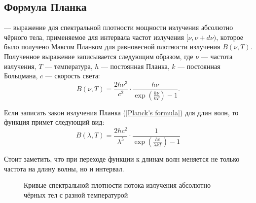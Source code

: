 \subsection{Формула Планка}

 --- выражение для спектральной плотности мощности излучения абсолютно чёрного тела, применяемое  для интервала частот излучения  $[\nu, \nu + d \nu)$, которое было получено Максом Планком для равновесной плотности излучения $B(\nu,T)$. Полученное выражение записывается следующим образом, где $\nu$ --- частота излучения, $T$ --- температура, $h$ --- постоянная Планка, $k$ --- постоянная Больцмана, $c$ --- скорость света:
\begin{equation}\label{Planck's formula}
B(\nu,T)=\frac{2h\nu^3}{c^2}\cdot \frac{h\nu}{\exp\left(\frac{h\nu}{kT}\right)-1}.
\end{equation}

Если записать закон излучения Планка (\ref{Planck's formula}) для длин волн, то функция примет следующий вид:
\begin{equation}\label{Planck's formula2}
B(\lambda,T)=\frac{2hc^2}{\lambda^5} \cdot \frac{1}{\exp\left(\frac{hc}{\lambda kT}\right)-1}
\end{equation}

Стоит заметить, что при переходе функции к длинам волн меняется не только частота на длину волны, но и интервал. 

\begin{figure}[h!]
\begin{center}
\end{center}
\caption{Кривые спектральной плотности потока излучения абсолютно чёрных тел с разной температурой}\label{pic:wien-law}
\end{figure}

